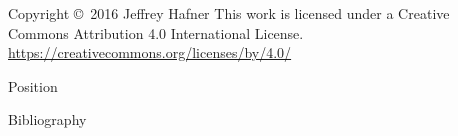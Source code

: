 \documentclass[avery5371,grid]{flashcards}
\begin{document}


\begin{flashcard}{Copyright \copyright \, 2016 Jeffrey Hafner}
\vspace{\fill}
This work is licensed under a Creative Commons Attribution 4.0 International License.
\vspace{\fill}
\flushright
\small\url{https://creativecommons.org/licenses/by/4.0/}
\end{flashcard}


\begin{flashcard}[Definition]{Position}
\begin{minipage}{0.6\linewidth}

    \vspace{\baselineskip}
\end{minipage}
\begin{minipage}{0.35\linewidth}
    \begin{center}
    \end{center}
\end{minipage}
\end{flashcard}


\begin{flashcard}[]{Bibliography}
    \printbibliography[title=]
\end{flashcard}
\end{document}
